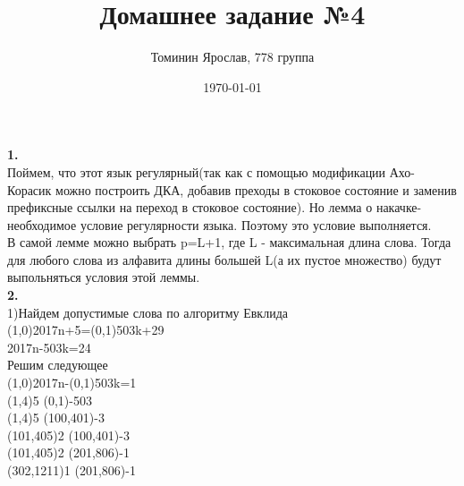 \documentclass[a4paper,12pt]{article}
\author{Томинин Ярослав, 778 группа}
\title{Домашнее задание №4}
\date{\today}
\begin{document}
 

\maketitle
\newpage
\textbf{1.}\\
Поймем, что этот язык регулярный(так как с помощью модификации Ахо-Корасик можно построить ДКА, добавив преходы в стоковое состояние и заменив префиксные ссылки на переход в стоковое состояние). Но лемма о накачке- необходимое условие регулярности языка. Поэтому это условие выполняется.\\
В самой лемме можно выбрать p=L+1, где L - максимальная длина слова. Тогда для любого слова из алфавита длины большей L(а их пустое множество) будут выпольняться условия этой леммы.\\
\textbf{2.}\\
1)Найдем допустимые слова по алгоритму Евклида\\
(1,0)2017n+5=(0,1)503k+29\\
2017n-503k=24\\
Решим следующее\\
(1,0)2017n-(0,1)503k=1\\
(1,4)5 (0,1)-503\\
(1,4)5 (100,401)-3\\
(101,405)2 (100,401)-3\\
(101,405)2 (201,806)-1\\
(302,1211)1 (201,806)-1\\
\end{document}
